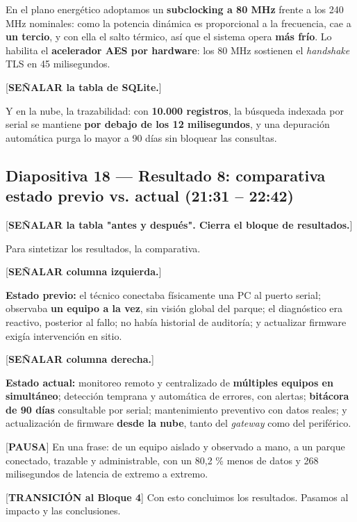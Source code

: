 \documentclass[11pt, a4paper]{article}
\begin{document}
En el plano energético adoptamos un \textbf{subclocking a 80 MHz} frente a los 240 MHz nominales: como la potencia dinámica es proporcional a la frecuencia, cae a \textbf{un tercio}, y con ella el salto térmico, así que el sistema opera \textbf{más frío}. Lo habilita el \textbf{acelerador AES por hardware}: los 80 MHz sostienen el \textit{handshake} TLS en 45 milisegundos.

[\textbf{SEÑALAR la tabla de SQLite.}]

Y en la nube, la trazabilidad: con \textbf{10.000 registros}, la búsqueda indexada por serial se mantiene \textbf{por debajo de los 12 milisegundos}, y una depuración automática purga lo mayor a 90 días sin bloquear las consultas.

\subsection*{Diapositiva 18 — Resultado 8: comparativa estado previo vs. actual (21:31 – 22:42)}

[\textbf{SEÑALAR la tabla "antes y después". Cierra el bloque de resultados.}]

Para sintetizar los resultados, la comparativa.

[\textbf{SEÑALAR columna izquierda.}]

\textbf{Estado previo:} el técnico conectaba físicamente una PC al puerto serial; observaba \textbf{un equipo a la vez}, sin visión global del parque; el diagnóstico era reactivo, posterior al fallo; no había historial de auditoría; y actualizar firmware exigía intervención en sitio.

[\textbf{SEÑALAR columna derecha.}]

\textbf{Estado actual:} monitoreo remoto y centralizado de \textbf{múltiples equipos en simultáneo}; detección temprana y automática de errores, con alertas; \textbf{bitácora de 90 días} consultable por serial; mantenimiento preventivo con datos reales; y actualización de firmware \textbf{desde la nube}, tanto del \textit{gateway} como del periférico.

[\textbf{PAUSA}] En una frase: de un equipo aislado y observado a mano, a un parque conectado, trazable y administrable, con un 80,2 \% menos de datos y 268 milisegundos de latencia de extremo a extremo.

[\textbf{TRANSICIÓN al Bloque 4}] Con esto concluimos los resultados. Pasamos al impacto y las conclusiones.

\hrulefill
\end{document}

